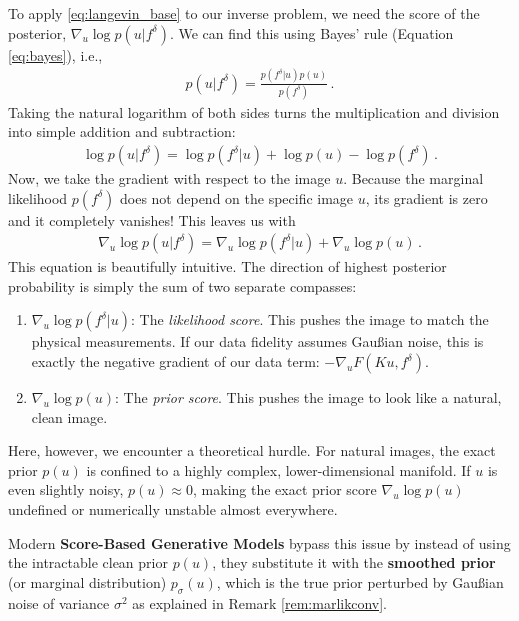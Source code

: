 To apply \eqref{eq:langevin_base} to our inverse problem, we need the score of the posterior, $\nabla_u \log p(u | f^\delta)$. We can find this using Bayes' rule (Equation \ref{eq:bayes}), i.e.,
\begin{align*}
    p(u | f^\delta) = \frac{p(f^\delta | u) p(u)}{p(f^\delta)} \, .
\end{align*}
Taking the natural logarithm of both sides turns the multiplication and division into simple addition and subtraction:
\begin{align*}
    \log p(u | f^\delta) = \log p(f^\delta | u) + \log p(u) - \log p(f^\delta) \, .
\end{align*}
Now, we take the gradient with respect to the image $u$. Because the marginal likelihood $p(f^\delta)$ does not depend on the specific image $u$, its gradient is zero and it completely vanishes! This leaves us with
\begin{align}
    \nabla_u \log p(u | f^\delta) = \nabla_u \log p(f^\delta | u) + \nabla_u \log p(u) \, .
    \label{eq:posterior_score_split}
\end{align}
This equation is beautifully intuitive. The direction of highest posterior probability is simply the sum of two separate compasses:

\begin{enumerate}
    \item $\nabla_u \log p(f^\delta | u)$: The \emph{likelihood score}. This pushes the image to match the physical measurements. If our data fidelity assumes Gau\ss ian noise, this is exactly the negative gradient of our data term: $-\nabla_u F(Ku, f^\delta)$.
    \item $\nabla_u \log p(u)$: The \emph{prior score}. This pushes the image to look like a natural, clean image. 
\end{enumerate}

Here, however, we encounter a theoretical hurdle. For natural images, the exact prior $p(u)$ is confined to a highly complex, lower-dimensional manifold. If $u$ is even slightly noisy, $p(u) \approx 0$, making the exact prior score $\nabla_u \log p(u)$ undefined or numerically unstable almost everywhere.

Modern \textbf{Score-Based Generative Models} bypass this issue by instead of using the intractable clean prior $p(u)$, they substitute it with the \textbf{smoothed prior} (or marginal distribution) $p_\sigma(u)$, which is the true prior perturbed by Gau\ss ian noise of variance $\sigma^2$ as explained in Remark \ref{rem:marlikconv}. 

